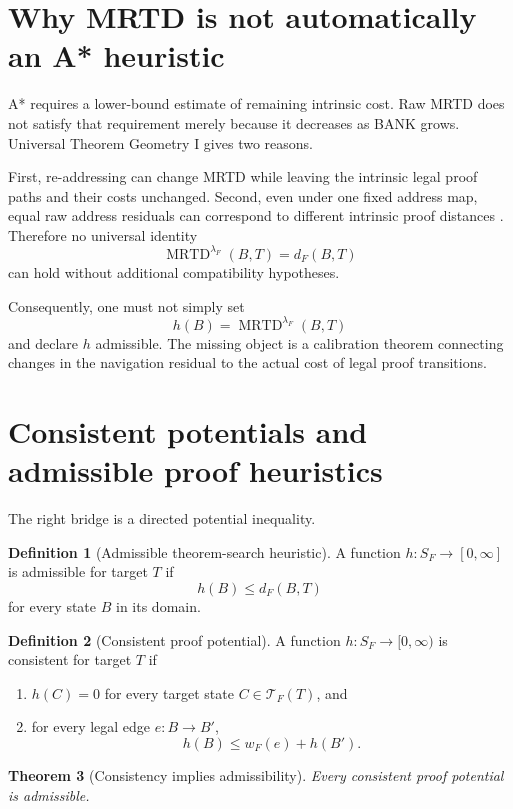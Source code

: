 \documentclass[11pt]{article}
\newtheorem{theorem}{Theorem}[section]
\theoremstyle{definition}
\newtheorem{definition}[theorem]{Definition}
\theoremstyle{remark}
\newcommand{\MRTD}{\operatorname{MRTD}}
\begin{document}
\section{Why MRTD is not automatically an A* heuristic}

A* requires a lower-bound estimate of remaining intrinsic cost. Raw MRTD does not satisfy that requirement merely because it decreases as BANK grows. Universal Theorem Geometry I gives two reasons.

First, re-addressing can change MRTD while leaving the intrinsic legal proof paths and their costs unchanged. Second, even under one fixed address map, equal raw address residuals can correspond to different intrinsic proof distances \cite{UTGI}. Therefore no universal identity
\[
\MRTD^{\lambda_F}(B,T)=d_F(B,T)
\]
can hold without additional compatibility hypotheses.

Consequently, one must not simply set
\[
h(B)=\MRTD^{\lambda_F}(B,T)
\]
and declare $h$ admissible. The missing object is a calibration theorem connecting changes in the navigation residual to the actual cost of legal proof transitions.

\section{Consistent potentials and admissible proof heuristics}

The right bridge is a directed potential inequality.

\begin{definition}[Admissible theorem-search heuristic]
A function $h:S_F\to[0,\infty]$ is admissible for target $T$ if
\[
h(B)\le d_F(B,T)
\]
for every state $B$ in its domain.
\end{definition}

\begin{definition}[Consistent proof potential]
A function $h:S_F\to[0,\infty)$ is consistent for target $T$ if
\begin{enumerate}[label=(\roman*)]
\item $h(C)=0$ for every target state $C\in\mathcal T_F(T)$, and
\item for every legal edge $e:B\to B'$,
\[
h(B)\le w_F(e)+h(B').
\]
\end{enumerate}
\end{definition}

\begin{theorem}[Consistency implies admissibility]\label{thm:consistency}
Every consistent proof potential is admissible.
\end{theorem}
\end{document}
